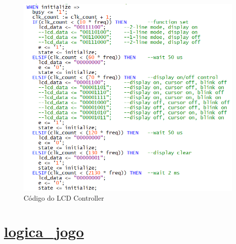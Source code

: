 \documentclass[14pt, oneside]{book}
\theoremstyle{definition}
\begin{document}
                \begin{figure}[H]
                    \centering
                    \includegraphics[scale=1]{lcdcontroller.png}
                    \caption{Código do LCD Controller}
                    \label{lcdcontroller}
                \end{figure}
               
                
            \section[logica\_jogo]{\hyperlink{toc}{logica\_jogo}}
            
\end{document}
